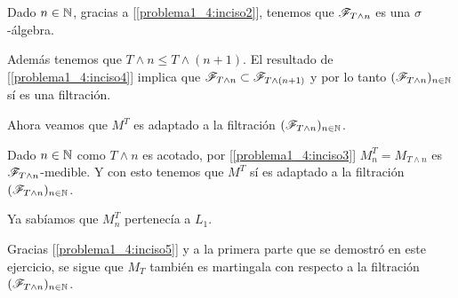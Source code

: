 	Dado $n \in \mathbb{N}$, gracias a [\ref{problema1_4:inciso2}], tenemos que $\mathscr{F}_{T \wedge n}$ es una $\sigma$-álgebra.\pn

	Además tenemos que $T \wedge n \leq T \wedge (n+1)$. El resultado de [\ref{problema1_4:inciso4}] implica que 
	$\mathscr{F}_{T \wedge n} \subset \mathscr{F}_{T \wedge (n+1)}$ y por lo tanto $(\mathscr{F}_{T \wedge n})_{n \in \mathbb{N}}$ sí es una filtración.\pn
	
	Ahora veamos que $M^T$ es adaptado a la filtración $(\mathscr{F}_{T \wedge n})_{n \in \mathbb{N}}$.\pn

	Dado $n \in \mathbb{N}$ como $T \wedge n$ es acotado, por [\ref{problema1_4:inciso3}] $M_n^T = M_{T \wedge n}$ es $\mathscr{F}_{T \wedge n}$-medible.
	Y con esto tenemos que $M^T$ sí es adaptado a la filtración $(\mathscr{F}_{T \wedge n})_{n \in \mathbb{N}}$.\pn
	
	Ya sabíamos que $M_n^T$ pertenecía a $L_1$.\pn
	
	Gracias [\ref{problema1_4:inciso5}] y a la primera parte que se demostró en este ejercicio, se sigue que $M_T$ también es
	martingala con respecto a la filtración $(\mathscr{F}_{T \wedge n})_{n \in \mathbb{N}}$.